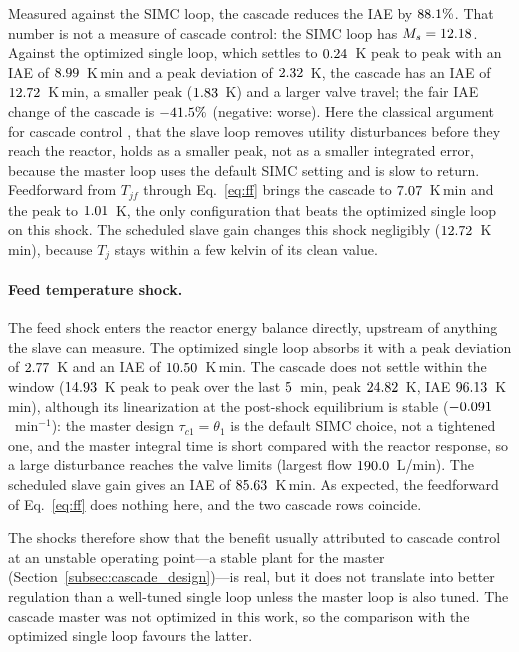 Measured against the SIMC loop, the cascade reduces the IAE by $88.1\%$. That number is not a measure of cascade control: the SIMC loop has $M_s=12.18$. Against the optimized single loop, which settles to $0.24$~K peak to peak with an IAE of $8.99$~K\,min and a peak deviation of $2.32$~K, the cascade has an IAE of $12.72$~K\,min, a smaller peak ($1.83$~K) and a larger valve travel; the fair IAE change of the cascade is $-41.5\%$ (negative: worse). Here the classical argument for cascade control \cite{shinskey1996process,seborg2010process,astrom2006pid}, that the slave loop removes utility disturbances before they reach the reactor, holds as a smaller peak, not as a smaller integrated error, because the master loop uses the default SIMC setting and is slow to return. Feedforward from $T_{jf}$ through Eq.~\eqref{eq:ff} brings the cascade to $7.07$~K\,min and the peak to $1.01$~K, the only configuration that beats the optimized single loop on this shock. The scheduled slave gain changes this shock negligibly ($12.72$~K\,min), because $T_j$ stays within a few kelvin of its clean value.

\paragraph{Feed temperature shock.} The feed shock enters the reactor energy balance directly, upstream of anything the slave can measure. The optimized single loop absorbs it with a peak deviation of $2.77$~K and an IAE of $10.50$~K\,min. The cascade does not settle within the window ($14.93$~K peak to peak over the last $5$~min, peak $24.82$~K, IAE $96.13$~K\,min), although its linearization at the post-shock equilibrium is stable ($-0.091$~min$^{-1}$): the master design $\tau_{c1}=\theta_1$ is the default SIMC choice, not a tightened one, and the master integral time is short compared with the reactor response, so a large disturbance reaches the valve limits (largest flow $190.0$~L/min). The scheduled slave gain gives an IAE of $85.63$~K\,min. As expected, the feedforward of Eq.~\eqref{eq:ff} does nothing here, and the two cascade rows coincide.

The shocks therefore show that the benefit usually attributed to cascade control at an unstable operating point---a stable plant for the master (Section~\ref{subsec:cascade_design})---is real, but it does not translate into better regulation than a well-tuned single loop unless the master loop is also tuned. The cascade master was not optimized in this work, so the comparison with the optimized single loop favours the latter.

